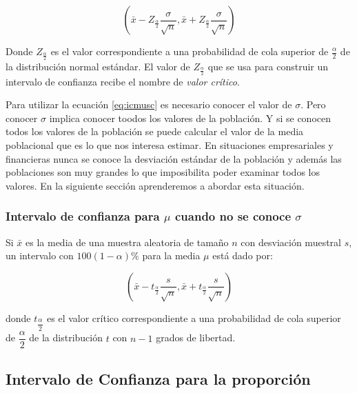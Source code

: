 \documentclass[]{book}
\begin{document}
\begin{equation} 
  \left(\bar{x} - Z_{\frac{\alpha}{2}}\dfrac{\sigma}{\sqrt{n}}, \bar{x} + Z_{\frac{\alpha}{2}}\dfrac{\sigma}{\sqrt{n}}  \right)
  \label{eq:icmusc}
\end{equation}

Donde \(Z_{\frac{\alpha}{2}}\) es el valor correspondiente a una
probabilidad de cola superior de \(\frac{\alpha}{2}\) de la distribución
normal estándar. El valor de \(Z_{\frac{\alpha}{2}}\) que se usa para
construir un intervalo de confianza recibe el nombre de \emph{valor
crítico}.

Para utilizar la ecuación \eqref{eq:icmusc} es necesario conocer el valor
de \(\sigma\). Pero conocer \(\sigma\) implica conocer toodos los
valores de la población. Y si se conocen todos los valores de la
población se puede calcular el valor de la media poblacional que es lo
que nos interesa estimar. En situaciones empresariales y financieras
nunca se conoce la desviación estándar de la población y además las
poblaciones son muy grandes lo que imposibilita poder examinar todos los
valores. En la siguiente sección aprenderemos a abordar esta situación.

\subsubsection{\texorpdfstring{Intervalo de confianza para \(\mu\)
cuando no se conoce
\(\sigma\)}{Intervalo de confianza para \textbackslash{}mu cuando no se conoce \textbackslash{}sigma}}\label{icsd}

Si \(\bar{x}\) es la media de una muestra aleatoria de tamaño \(n\) con
desviación muestral \(s\), un intervalo con
\(100\left(1-\alpha\right)\%\) para la media \(\mu\) está dado por:

\begin{equation} 
  \left(\bar{x} - t_{\frac{\alpha}{2}}\dfrac{s}{\sqrt{n}}, \bar{x} + t_{\frac{\alpha}{2}}\dfrac{s}{\sqrt{n}}  \right)
  \label{eq:icmusd}
\end{equation}

donde \(t_{\dfrac{\alpha}{2}}\) es el valor crítico correspondiente a
una probabilidad de cola superior de \(\dfrac{\alpha}{2}\) de la
distribución \(t\) con \(n-1\) grados de libertad.

\subsection{Intervalo de Confianza para la
proporción}\label{intervalo-de-confianza-para-la-proporcion}
\end{document}
